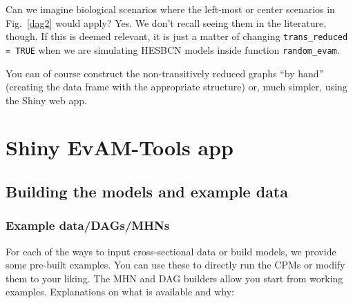 \documentclass[a4paper,11pt]{article}
\begin{document}




Can we imagine biological scenarios where the left-most or center scenarios in Fig.~\ref{dag2} would apply? Yes. We don't recall seeing them in the literature, though. If this is deemed relevant, it is just a matter of changing  \texttt{trans\_reduced = TRUE} when we are simulating HESBCN models inside function \texttt{random\_evam}.

You can of course construct the non-transitively reduced graphs ``by hand'' (creating the data frame with the appropriate structure) or, much simpler, using the Shiny web app.





\section{Shiny EvAM-Tools app}
\subsection{Building the models and example data}
\label{sec:build-models-example}

\subsubsection{Example data/DAGs/MHNs}
\label{sec:exampe-datadagsmhns}

For each of the ways to input cross-sectional data or build models, we provide some pre-built examples. You can use these to directly run the CPMs or modify them to your liking. The MHN and DAG builders allow you start from working examples. Explanations on what is available and why: 
\end{document}
